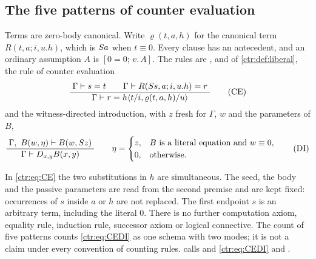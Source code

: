 \subsection{The five patterns of counter evaluation}

\begin{definition}\label{ctr:def:ce}
Terms are zero-body canonical. Write $\varrho(t,a,h)$ for the canonical term
$R(t,a;i,u.h)$, which is $S a$ when $t\equiv 0$. Every clause has an antecedent, and an
ordinary assumption $A$ is $[0=0;\,v.\,A]$. The rules are , 
and  of \cref{ctr:def:liberal}, the rule of counter evaluation
\begin{equation}\label{ctr:eq:CE}
 \dfrac{\;\Gamma\vdash s=t\qquad \Gamma\vdash R(S s,a;i,u.h)=r\;}{\;\Gamma\vdash r=h\langle t/i,\varrho(t,a,h)/u\rangle\;}\tag{CE}
\end{equation}
and the witness-directed introduction, with $z$ fresh for $\Gamma$, $w$ and the parameters
of $B$,
\begin{equation}\label{ctr:eq:CEDI}
 \dfrac{\;\Gamma,\ B(w,\eta)\vdash B(w,S z)\;}{\;\Gamma\vdash D_{x,y}B(x,y)\;}
 \qquad
 \eta=\begin{cases} z, & B \text{ is a literal equation and } w\equiv 0,\\
                    0, & \text{otherwise.}\end{cases}\tag{DI}
\end{equation}
\end{definition}

In \eqref{ctr:eq:CE} the two substitutions in $h$ are simultaneous. The seed, the body and
the passive parameters are read from the second premise and are kept fixed: occurrences of
$s$ inside $a$ or $h$ are not replaced. The first endpoint $s$ is an arbitrary term,
including the literal $0$. There is no further computation axiom, equality rule, induction
rule, successor axiom or logical connective. The count of five patterns counts
\eqref{ctr:eq:CEDI} as one schema with two modes; it is not a claim under every convention
of counting rules.  calls  and \eqref{ctr:eq:CEDI}
 and .

